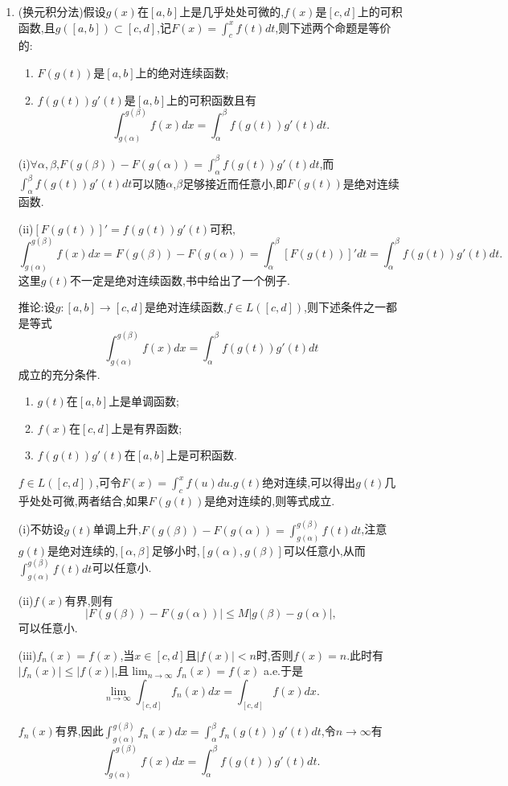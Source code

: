 \documentclass[12pt,a4paper,openany]{book}
\begin{document}
\begin{enumerate}
\item (换元积分法)假设$g(x)$在$[a,b]$上是几乎处处可微的,$f(x)$是$[c,d]$上的可积函数,且$g([a,b])\subset[c,d]$,记$F(x)=\int_{c}^{x}{f(t)dt}$,则下述两个命题是等价的:
\begin{enumerate}
\item[(i)] $F(g(t))$是$[a,b]$上的绝对连续函数;
\item[(ii)] $f(g(t))g'(t)$是$[a,b]$上的可积函数且有
\[
\int_{g(\alpha)}^{g(\beta)}{f(x)dx}=\int_{\alpha}^{\beta}{f(g(t))g'(t)dt}.
\]
\end{enumerate}

(i)$\forall \alpha,\beta$,$F(g(\beta)) - F(g(\alpha)) = \int_{\alpha}^{\beta}{f(g(t))g'(t)dt}$,而$\int_{\alpha}^{\beta}{f(g(t))g'(t)dt}$可以随$\alpha$,$\beta$足够接近而任意小,即$F(g(t))$是绝对连续函数.

(ii)$[F(g(t))]'=f(g(t))g'(t)$可积,
\[
\int_{g(\alpha)}^{g(\beta)}{f(x)dx}=F(g(\beta)) - F(g(\alpha))=\int_{\alpha}^{\beta}{[F(g(t))]'dt}=\int_{\alpha}^{\beta}{f(g(t))g'(t)dt}.
\]
这里$g(t)$不一定是绝对连续函数,书中给出了一个例子.

推论:设$g:[a,b] \rightarrow [c,d]$是绝对连续函数,$f \in L([c,d])$,则下述条件之一都是等式
\[
\int_{g(\alpha)}^{g(\beta)}{f(x)dx}=\int_{\alpha}^{\beta}{f(g(t))g'(t)dt}
\]
成立的充分条件.
\begin{enumerate}
\item[(i)]$g(t)$在$[a,b]$上是单调函数;
\item[(ii)]$f(x)$在$[c,d]$上是有界函数;
\item[(iii)]$f(g(t))g'(t)$在$[a,b]$上是可积函数.
\end{enumerate}

$f \in L([c,d])$,可令$F(x)=\int_{c}^{x}{f(u)du}$.$g(t)$绝对连续,可以得出$g(t)$几乎处处可微,两者结合,如果$F(g(t))$是绝对连续的,则等式成立.

(i)不妨设$g(t)$单调上升,$F(g(\beta)) - F(g(\alpha))=\int_{g(\alpha)}^{g(\beta)}{f(t)dt}$,注意$g(t)$是绝对连续的,$[\alpha,\beta]$足够小时,$[g(\alpha),g(\beta)]$可以任意小,从而$\int_{g(\alpha)}^{g(\beta)}{f(t)dt}$可以任意小.

(ii)$f(x)$有界,则有
\[
|F(g(\beta))-F(g(\alpha))| \le M|g(\beta)-g(\alpha)|,
\]
可以任意小.

(iii)$f_n(x)=f(x)$,当$x \in [c,d]$且$|f(x)|<n$时,否则$f(x)=n$.此时有$|f_n(x)|\le|f(x)|$,且$\lim_{n \rightarrow \infty}{f_n(x)}=f(x)$ a.e.于是
\[
\lim_{n \rightarrow \infty}{\int_{[c,d]}{f_n(x)dx}} = \int_{[c,d]}{f(x)dx}.
\]

$f_n(x)$有界,因此$\int_{g(\alpha)}^{g(\beta)}{f_n(x)dx}=\int_{\alpha}^{\beta}{f_n(g(t))g'(t)dt}$,令$n \rightarrow \infty$有
\[
\int_{g(\alpha)}^{g(\beta)}{f(x)dx}=\int_{\alpha}^{\beta}{f(g(t))g'(t)dt}.
\]
\end{enumerate}
\end{document}
